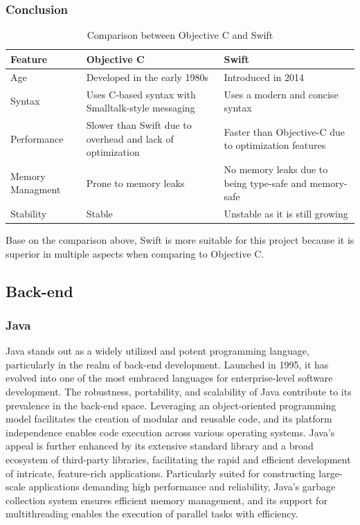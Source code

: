 \subsubsection{Conclusion}

\begin{table}[H]
    \centering
    \begin{tabular}{| >{\centering\arraybackslash}m{2cm} | >{\centering\arraybackslash}m{6cm} | >{\centering\arraybackslash}m{6cm} |}
        \hline
        \textbf{Feature} & \textbf{Objective C} & \textbf{Swift} \\ \hline
        Age & Developed in the early 1980s & Introduced in 2014 \\ \hline
        Syntax & Uses C-based syntax with Smalltalk-style messaging & Uses a modern and concise syntax \\ \hline
        Performance & Slower than Swift due to overhead and lack of optimization & Faster than Objective-C due to optimization features \\ \hline
        Memory Managment & Prone to memory leaks & No memory leaks due to being type-safe and memory-safe \\ \hline
        Stability & Stable & Unstable as it is still growing \\ \hline
    \end{tabular}
    \caption{Comparison between Objective C and Swift}
\end{table}

Base on the comparison above, Swift is more suitable for this project because it is superior in multiple aspects when comparing to Objective C.

\subsection{Back-end}

\subsubsection{Java}

Java stands out as a widely utilized and potent programming language, particularly in the realm of back-end development. Launched in 1995, it has evolved into one of the most embraced languages for enterprise-level software development. The robustness, portability, and scalability of Java contribute to its prevalence in the back-end space. Leveraging an object-oriented programming model facilitates the creation of modular and reusable code, and its platform independence enables code execution across various operating systems. Java's appeal is further enhanced by its extensive standard library and a broad ecosystem of third-party libraries, facilitating the rapid and efficient development of intricate, feature-rich applications. Particularly suited for constructing large-scale applications demanding high performance and reliability, Java's garbage collection system ensures efficient memory management, and its support for multithreading enables the execution of parallel tasks with efficiency.

